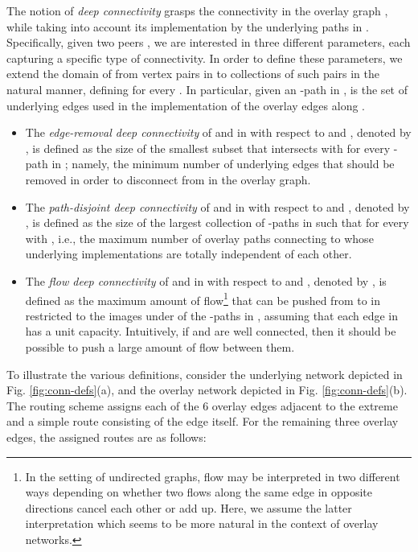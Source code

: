 \LongVersion \documentclass[11pt]{article}
\theoremstyle{definition}
\theoremstyle{plain}
\begin{document}
The notion of \emph{deep connectivity} grasps the
connectivity in the overlay graph , while taking into account its
implementation by the underlying paths in .
Specifically, given two peers , we are interested in three
different parameters, each capturing a specific type of connectivity.
In order to define these parameters, we extend the domain of  from
vertex pairs in  to collections of such pairs in the
natural manner, defining  for
every .
In particular, given an -path  in ,  is the set of underlying edges used in the implementation of
the overlay edges along .
\begin{itemize}

\item
The \emph{edge-removal deep connectivity} of  and  in  with respect
to  and , denoted by , is defined as the size
of the smallest subset  that intersects with
 for every -path  in ;
namely, the minimum number of underlying edges that should be removed in order
to disconnect  from  in the overlay graph.

\item
The \emph{path-disjoint deep connectivity} of  and  in  with
respect to  and , denoted by , is defined as
the size of the largest collection  of -paths in  such that
 for every  with , i.e., the maximum number of overlay paths connecting  to 
whose underlying implementations are totally independent of each other.

\item
The \emph{flow deep connectivity} of  and  in  with respect to 
and , denoted by , is defined as the maximum
amount of flow\footnote{
In the setting of undirected graphs, flow may be interpreted in two different
ways depending on whether two flows along the same edge in opposite directions
cancel each other or add up.
Here, we assume the latter interpretation which seems to be more natural in
the context of overlay networks.
} that can be pushed from  to  in  restricted to the
images under  of the -paths in , assuming that each edge in
 has a unit capacity.
Intuitively, if  and  are well connected, then it should be possible to
push a large amount of flow between them.

\end{itemize}

\par
{}
To illustrate the various definitions,
consider the underlying network  depicted in Fig. \ref{fig:conn-defs}(a),
and the overlay network  depicted in Fig. \ref{fig:conn-defs}(b).
The routing scheme  assigns each of the 6 overlay edges adjacent to
the extreme  and  a simple route consisting of the edge itself.
For the remaining three overlay edges, the assigned routes are as follows:
\end{document}
